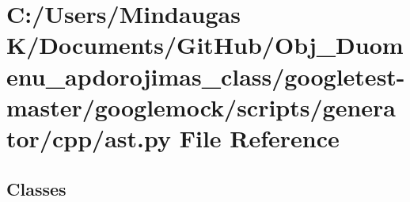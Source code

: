 \hypertarget{googletest-master_2googlemock_2scripts_2generator_2cpp_2ast_8py}{}\section{C\+:/\+Users/\+Mindaugas K/\+Documents/\+Git\+Hub/\+Obj\+\_\+\+Duomenu\+\_\+apdorojimas\+\_\+class/googletest-\/master/googlemock/scripts/generator/cpp/ast.py File Reference}
\label{googletest-master_2googlemock_2scripts_2generator_2cpp_2ast_8py}
\subsection*{Classes}
